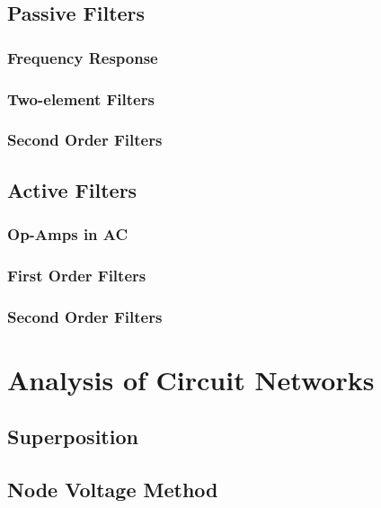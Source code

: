 \documentclass[a4paper,11pt]{book}
\begin{document}
\chapter{Passive Filters}
\section{Frequency Response}

\section{Two-element Filters}

\section{Second Order Filters}


\chapter{Active Filters}
\section{Op-Amps in AC}

\section{First Order Filters}

\section{Second Order Filters}


\part{Analysis of Circuit Networks}
\chapter{Superposition}

\chapter{Node Voltage Method}
\end{document}
